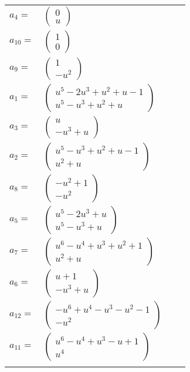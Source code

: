 \documentclass[1p]{elsarticle_modified}
\theoremstyle{definition}
\begin{document}
\begin{tabular}{m{7pt} m{180pt} m{7pt} m{180pt} }
\flushright $a_{4}=$&$\begin{pmatrix}0\\u\end{pmatrix}$ \\
\flushright $a_{10}=$&$\begin{pmatrix}1\\0\end{pmatrix}$ \\
\flushright $a_{9}=$&$\begin{pmatrix}1\\- u^2\end{pmatrix}$ \\
\flushright $a_{1}=$&$\begin{pmatrix}u^5-2 u^3+u^2+u-1\\u^5- u^3+u^2+u\end{pmatrix}$ \\
\flushright $a_{3}=$&$\begin{pmatrix}u\\- u^3+u\end{pmatrix}$ \\
\flushright $a_{2}=$&$\begin{pmatrix}u^5- u^3+u^2+u-1\\u^2+u\end{pmatrix}$ \\
\flushright $a_{8}=$&$\begin{pmatrix}- u^2+1\\- u^2\end{pmatrix}$ \\
\flushright $a_{5}=$&$\begin{pmatrix}u^5-2 u^3+u\\u^5- u^3+u\end{pmatrix}$ \\
\flushright $a_{7}=$&$\begin{pmatrix}u^6- u^4+u^3+u^2+1\\u^2+u\end{pmatrix}$ \\
\flushright $a_{6}=$&$\begin{pmatrix}u+1\\- u^3+u\end{pmatrix}$ \\
\flushright $a_{12}=$&$\begin{pmatrix}- u^6+u^4- u^3- u^2-1\\- u^2\end{pmatrix}$ \\
\flushright $a_{11}=$&$\begin{pmatrix}u^6- u^4+u^3- u+1\\u^4\end{pmatrix}$\\&\end{tabular}
\end{document}
